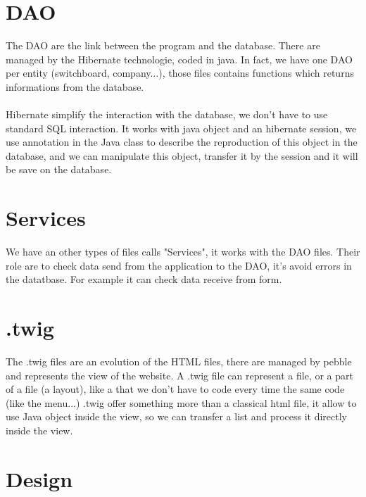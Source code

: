 \section{DAO}

The DAO are the link between the program and the database. There are managed by the Hibernate technologie, coded in java.
In fact, we have one DAO per entity (switchboard, company...), those files contains functions which returns informations from the database.
\\
\\
Hibernate simplify the interaction with the database, we don't have to use standard SQL interaction.
It works with java object and an hibernate session, we use annotation in the Java class to describe the reproduction of this object in the database,
and we can manipulate this object, transfer it by the session and it will be save on the database.

\section{Services}

We have an other types of files calls "Services", it works with the DAO files.
Their role are to check data send from the application to the DAO, it's avoid errors in the datatbase.
For example it can check data receive from form.


\section{.twig}

The .twig files are an evolution of the HTML files, there are managed by pebble and represents the view of the website.
A .twig file can represent a file, or a part of a file (a layout), like a that we don't have to code every time the same code (like the menu...)
.twig offer something more than a classical html file, it allow to use Java object inside the view, so we can transfer a list and process it directly inside the view.


\section{Design}

